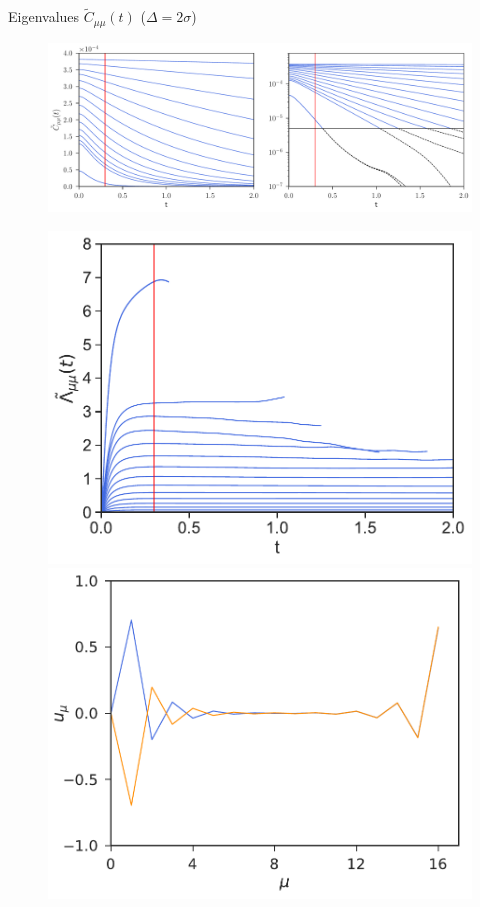 \documentclass{beamer}
\begin{document}
\begin{frame}{Eigenvalues $\tilde{C}_{\mu\mu}(t)$ ($\Delta=2\sigma$)}
\begin{figure}[h!]
  \includegraphics[width=0.87\linewidth]{CtRec-WALLS-17nodes-exp}
\end{figure}
\begin{figure}[h!]
\includegraphics[scale=0.315]{LambdatRec-WALLS-17nodes}
\includegraphics[scale=0.315]{Eigenvectors-WALLS-17nodes}
\end{figure}
\end{frame}
\end{document}
